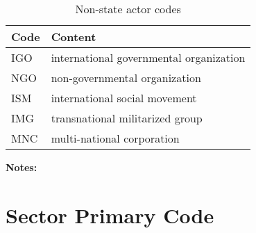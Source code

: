 \documentclass[11pt]{report}
\begin{document}
\begin{table}[htp]
\caption{Non-state actor codes}
\begin{center}
\begin{tabular}{|l|l|}
\hline
Code & Content \\
\hline
IGO   &   international governmental organization\\
NGO &   non-governmental organization\\
ISM           &   international social movement\\
IMG            &   transnational militarized group\\
MNC            &   multi-national corporation\\
\hline
\end{tabular}
\end{center}
\label{tab:nonstate}
\noindent \textbf{Notes:}
\end{table}%

\section{Sector Primary Code}
\end{document}
